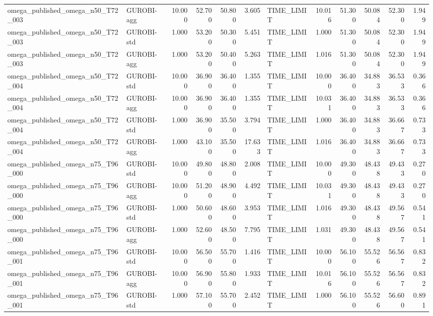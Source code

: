 \begin{table}[htbp]
\begin{tabular}{llrrrrlrrrrr}
omega\_published\_omega\_n50\_T72\_003 & GUROBI-agg & 10.000 & 52.700 & 50.800 & 3.605 & TIME\_LIMIT & 10.016 & 51.300 & 50.084 & 52.300 & 1.949 \\
omega\_published\_omega\_n50\_T72\_003 & GUROBI-std & 1.000 & 53.200 & 50.300 & 5.451 & TIME\_LIMIT & 1.000 & 51.300 & 50.084 & 52.300 & 1.949 \\
omega\_published\_omega\_n50\_T72\_003 & GUROBI-agg & 1.000 & 53.200 & 50.400 & 5.263 & TIME\_LIMIT & 1.016 & 51.300 & 50.084 & 52.300 & 1.949 \\
omega\_published\_omega\_n50\_T72\_004 & GUROBI-std & 10.000 & 36.900 & 36.400 & 1.355 & TIME\_LIMIT & 10.000 & 36.400 & 34.883 & 36.533 & 0.366 \\
omega\_published\_omega\_n50\_T72\_004 & GUROBI-agg & 10.000 & 36.900 & 36.400 & 1.355 & TIME\_LIMIT & 10.031 & 36.400 & 34.883 & 36.533 & 0.366 \\
omega\_published\_omega\_n50\_T72\_004 & GUROBI-std & 1.000 & 36.900 & 35.500 & 3.794 & TIME\_LIMIT & 1.000 & 36.400 & 34.883 & 36.667 & 0.733 \\
omega\_published\_omega\_n50\_T72\_004 & GUROBI-agg & 1.000 & 43.100 & 35.500 & 17.633 & TIME\_LIMIT & 1.016 & 36.400 & 34.883 & 36.667 & 0.733 \\
omega\_published\_omega\_n75\_T96\_000 & GUROBI-std & 10.000 & 49.800 & 48.800 & 2.008 & TIME\_LIMIT & 10.000 & 49.300 & 48.438 & 49.433 & 0.270 \\
omega\_published\_omega\_n75\_T96\_000 & GUROBI-agg & 10.000 & 51.200 & 48.900 & 4.492 & TIME\_LIMIT & 10.031 & 49.300 & 48.438 & 49.433 & 0.270 \\
omega\_published\_omega\_n75\_T96\_000 & GUROBI-std & 1.000 & 50.600 & 48.600 & 3.953 & TIME\_LIMIT & 1.016 & 49.300 & 48.438 & 49.567 & 0.541 \\
omega\_published\_omega\_n75\_T96\_000 & GUROBI-agg & 1.000 & 52.600 & 48.500 & 7.795 & TIME\_LIMIT & 1.031 & 49.300 & 48.438 & 49.567 & 0.541 \\
omega\_published\_omega\_n75\_T96\_001 & GUROBI-std & 10.000 & 56.500 & 55.700 & 1.416 & TIME\_LIMIT & 10.000 & 56.100 & 55.526 & 56.567 & 0.832 \\
omega\_published\_omega\_n75\_T96\_001 & GUROBI-agg & 10.000 & 56.900 & 55.800 & 1.933 & TIME\_LIMIT & 10.016 & 56.100 & 55.526 & 56.567 & 0.832 \\
omega\_published\_omega\_n75\_T96\_001 & GUROBI-std & 1.000 & 57.100 & 55.700 & 2.452 & TIME\_LIMIT & 1.000 & 56.100 & 55.526 & 56.600 & 0.891 \\

\end{tabular}
\end{table}

